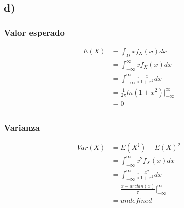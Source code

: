\documentclass{article}
\begin{document}
\begin{tcolorbox}[breakable]
    \subsection*{d)}
    \subsubsection*{Valor esperado}
    \begin{align*}
        E(X) 
        &= \int_\Omega xf_X(x)dx \\
        &= \int_{-\infty}^\infty xf_X(x)dx \\
        &= \int_{-\infty}^\infty \frac{1}{\pi}\frac{x}{1+x^2}dx \\ 
        &= \frac{1}{2\pi}ln(1+x^2)\bigg|_{-\infty}^\infty \\
        &= 0 \\
    \end{align*}
    \subsubsection*{Varianza}
    \begin{align*}
        Var(X)&= E(X^2)-E(X)^2 \\
        &= \int_{-\infty}^\infty x^2f_X(x)dx \\
        &= \int_{-\infty}^\infty \frac{1}{\pi}\frac{x^2}{1+x^2}dx \\
        &= \frac{x-arctan(x)}{\pi} \bigg|_{-\infty}^\infty \\
        &= undefined
    \end{align*}

\end{tcolorbox}
\end{document}
